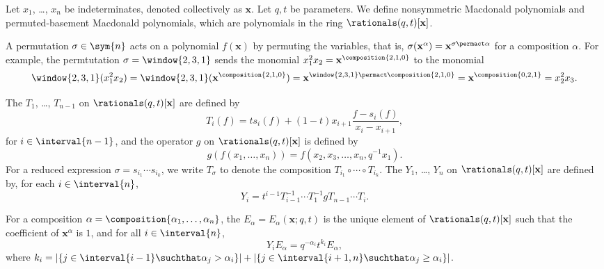 Let \(x_1\), \dots, \(x_n\) be indeterminates, denoted collectively as \(\mathbf{x}\).
Let \(q, t\) be parameters.
We define nonsymmetric Macdonald polynomials and permuted-basement Macdonald polynomials,
which are polynomials in the ring \(\rationals(q, t)[\mathbf{x}]\).

A permutation \(\sigma \in \sym{n}\) acts on
a polynomial \(f(\mathbf{x})\) by permuting the variables,
that is,
\(\sigma (\mathbf{x}^{\alpha}) = \mathbf{x}^{\sigma \permact \alpha}\)
for a composition \(\alpha\).
For example, the permtutation \(\sigma = \window{2, 3, 1}\) sends the monomial \(x_1^2 x_2 = \mathbf{x}^{\composition{2, 1, 0}}\) to the monomial
\begin{equation*}
    \window{2, 3, 1} (x_1^2 x_2)
    = \window{2, 3, 1}(\mathbf{x}^{\composition{2, 1, 0}})
    = \mathbf{x}^{\window{2, 3, 1} \permact \composition{2, 1, 0}}
    = \mathbf{x}^{\composition{0, 2, 1}}
    = x_2^2 x_3.
\end{equation*}

The 
\(T_1\), \dots, \(T_{n-1}\) on \(\rationals(q, t)[\mathbf{x}]\)
are defined by
\begin{equation*}
	T_i(f) = ts_i(f) + (1-t) x_{i+1} \frac{f - s_i(f)}{x_i - x_{i+1}},
\end{equation*}
for \(i \in \interval{n-1}\),
and the operator \(g\) on \(\rationals(q, t)[\mathbf{x}]\) is defined by
\begin{equation*}
	g(f(x_1, \ldots, x_n)) = f(x_2, x_3, \ldots, x_n, q^{-1}x_1).
\end{equation*}
For a reduced expression \( \sigma = s_{i_1} \cdots s_{i_k} \),
we write \(T_\sigma\) to denote the composition \(T_{i_1} \circ \cdots \circ T_{i_k}\).
The 
\(Y_1\), \dots, \(Y_n\) on \(\rationals(q, t)[\mathbf{x}]\)
are defined by,
for each \(i \in \interval{n}\),
\begin{equation*}
	Y_i = t^{i-1} T_{i-1}^{-1} \cdots T_1^{-1} g T_{n-1} \cdots T_i.
\end{equation*}

\begin{definition}
	For a composition \(\alpha=\composition{\alpha_1,\ldots,\alpha_n}\),
	the  \(E_\alpha=E_\alpha(\mathbf{x}; q, t)\) is
	the unique element of \(\rationals(q, t)[\mathbf{x}]\) such that
	the coefficient of \(\mathbf{x}^{\alpha}\) is \(1\),
	and for all \(i\in\interval{n}\),
	\begin{equation*}
		Y_i E_\alpha = q^{-\alpha_i} t^{k_i} E_\alpha,
	\end{equation*}
	where
	\(
		k_i = |\{ j \in \interval{i-1} \suchthat \alpha_j > \alpha_i \}|
			+ |\{ j \in \interval{i+1, n} \suchthat \alpha_j \geq \alpha_i \}|
	\).
\end{definition}

